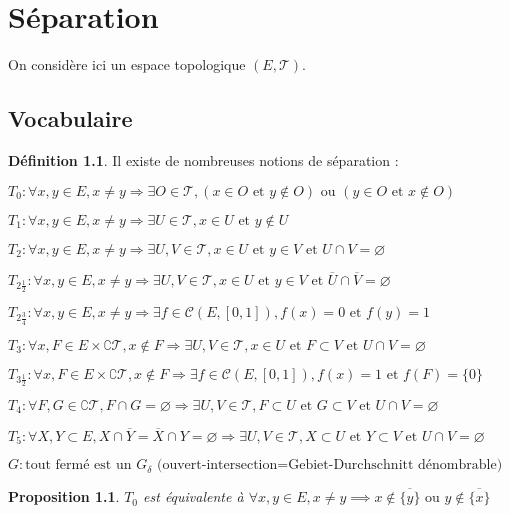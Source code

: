 \documentclass[a4paper, 11pt, french]{book}
\newenvironment{itemise}{\itemize}{\enditemize}
\theoremstyle{plain} %
\newtheorem{proposition}{Proposition}
\theoremstyle{definition} %
\newtheorem{definition}{Définition}
\theoremstyle{remark} %
\newcommand{\1}{\mathds{1}}
\newcommand\vide{\varnothing}
\newcommand\et{\text{ et }}
\newcommand\ou{\text{ ou }}
\renewcommand{\cal}[1]{\mathcal{#1}}
\newcommand{\scr}[1]{\mathscr{#1}}
\begin{document}
\chapter{Séparation}

On considère ici un espace topologique $(E, \scr{T})$.

\section{Vocabulaire}

\begin{definition}
	Il existe de nombreuses notions de séparation :
	\begin{itemise}
		\item $T_0:\forall x, y\in E, x\neq y\Rightarrow\exists O\in\scr{T}, (x\in O\et y\notin O)\ou(y\in O\et x\notin O)$
		\item $T_1:\forall x, y\in E, x\neq y\Rightarrow\exists U\in\scr{T}, x\in U\et y\notin U$
		\item $T_2:\forall x, y\in E, x\neq y\Rightarrow\exists U, V\in\scr{T}, x\in U\et y\in V\et U\cap V=\vide$
		\item $T_{2\frac{1}{2}}:\forall x, y\in E, x\neq y\Rightarrow\exists U, V\in\scr{T}, x\in U\et y\in V\et\overline{U}\cap\overline{V}=\vide$
		\item $T_{2\frac{3}{4}}:\forall x, y\in E, x\neq y\Rightarrow\exists f\in\cal{C}(E, [0, 1]), f(x)=0\et f(y)=1$
		\item $T_3:\forall x, F\in E\times\complement\scr{T}, x\notin F\Rightarrow\exists U, V\in\scr{T}, x\in U\et F\subset V\et U\cap V=\vide$
		\item $T_{3\frac{1}{2}}:\forall x, F\in E\times\complement\scr{T}, x\notin F\Rightarrow\exists f\in\mathcal{C}(E, [0, 1]), f(x)=1\et f(F)=\{0\}$
		\item $T_4:\forall F, G\in\complement\scr{T}, F\cap G=\vide\Rightarrow\exists U, V\in\scr{T}, F\subset U\et G\subset V\et U\cap V=\vide$
		\item $T_5:\forall X, Y\subset E, X\cap\overline{Y}=\overline{X}\cap Y=\vide\Rightarrow\exists U, V\in\scr{T}, X\subset U\et Y\subset V\et U\cap V=\vide$
		\item $G:\text{tout fermé est un $G_\delta$ (ouvert-intersection=Gebiet-Durchschnitt dénombrable)}$
	\end{itemise}
\end{definition}

\begin{proposition}
	$T_0$ est équivalente à $\forall x, y\in E, x\neq y\implies x\notin\overline{\{y\}}\ou y\notin\overline{\{x\}}$
\end{proposition}
\end{document}
